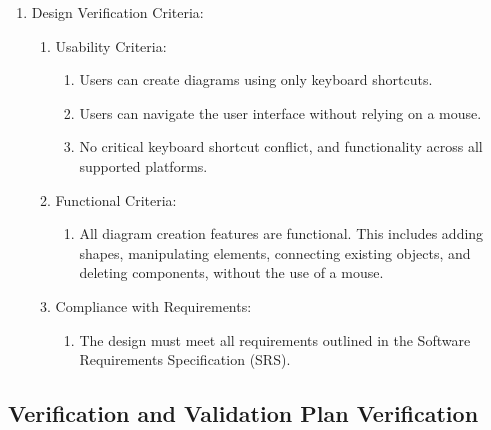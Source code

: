 \documentclass[12pt, titlepage]{article}
\begin{document}
\begin{enumerate}
\item Design Verification Criteria:
\begin{enumerate}
\item Usability Criteria:
\begin{enumerate}
\item Users can create diagrams using only
keyboard shortcuts.
\item Users can navigate the user interface
without relying on a mouse.
\item No critical keyboard shortcut conflict,
and functionality across all supported platforms.
\end{enumerate}
\item Functional Criteria:
\begin{enumerate}
\item All diagram creation features are functional.
This includes adding shapes, manipulating elements,
connecting existing objects, and deleting components,
without the use of a mouse.
\end{enumerate}
\item Compliance with Requirements:
\begin{enumerate}
\item The design must meet all requirements outlined in the
Software Requirements Specification (SRS).
\end{enumerate}
\end{enumerate}
\end{enumerate}

\subsection{Verification and Validation Plan Verification}
\end{document}
